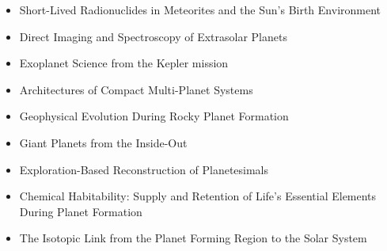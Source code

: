 \documentclass[11pt]{article}
\begin{document}
\begin{itemize}
 \item Short-Lived Radionuclides in Meteorites and the Sun’s Birth Environment
 \item Direct Imaging and Spectroscopy of Extrasolar Planets
 \item Exoplanet Science from the Kepler mission
 \item Architectures of Compact Multi-Planet Systems
 \item Geophysical Evolution During Rocky Planet Formation
 \item Giant Planets from the Inside-Out
 \item Exploration-Based Reconstruction of Planetesimals
 \item Chemical Habitability: Supply and Retention of Life’s Essential Elements During Planet Formation
 \item The Isotopic Link from the Planet Forming Region to the Solar System
\end{itemize}


\end{document}
